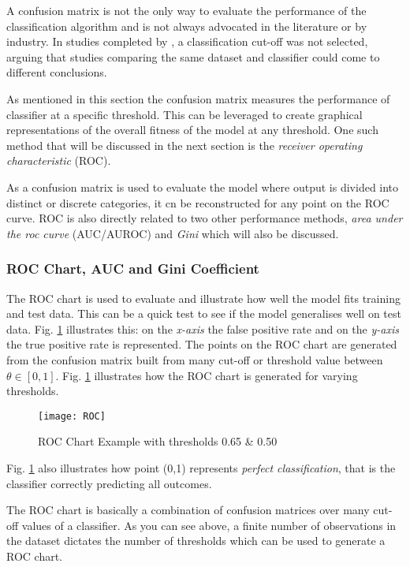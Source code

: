 A confusion matrix is not the only way to evaluate the performance of the classification algorithm and is not always advocated in the literature or by industry. In studies completed by \cite{lessmann_benchmarking_2008}, a classification cut-off was not selected, arguing that studies comparing the same dataset and classifier could come to different conclusions.

As mentioned in this section the confusion matrix measures the performance of classifier at a specific threshold. This can be leveraged to create graphical representations of the overall fitness of the model at any threshold. One such method that will be discussed in the next section is the \textit{receiver operating characteristic} (ROC). 


As a confusion matrix is used to evaluate the model where output is divided into distinct or discrete categories, it cn be reconstructed for any point on the ROC curve. ROC is also directly related to two other performance methods, \textit{area under the roc curve} (AUC/AUROC) and \textit{Gini} which will also be discussed.  

\subsubsection{ROC Chart, AUC and Gini Coefficient}
The ROC chart is used to evaluate and illustrate how well the model fits training and test data. This can be a quick test to see if the model generalises well on test data. Fig. \ref{fig:ROC} illustrates this: on the \textit{x-axis} the false positive rate and on the \textit{y-axis} the true positive rate is represented. The points on the ROC chart are generated from the confusion matrix built from many cut-off or threshold value between $\theta \in [0,1]$. Fig. \ref{fig:ROC} illustrates how the ROC chart is generated for varying thresholds. 

\begin{figure}[H]
	\texttt{[image: ROC]}
	\caption[ROC]
	{ROC Chart Example with thresholds 0.65 \& 0.50}
	\label{fig:ROC}
\end{figure}

Fig. \ref{fig:ROC} also illustrates how point (0,1) represents \textit{perfect classification}, that is the classifier correctly predicting all outcomes. 

The ROC chart is basically a combination of confusion matrices over many cut-off values of a classifier. As you can see above, a finite number of observations in the dataset dictates the number of thresholds which can be used to generate a ROC chart.

